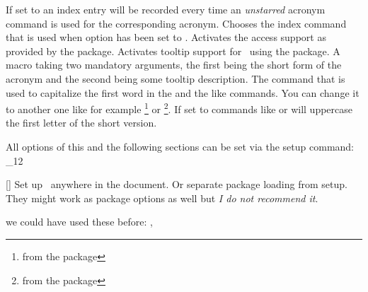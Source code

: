 \documentclass[load-preamble+]{cnltx-doc}
\makeatletter
\renewenvironment{commands}
  {%
    \cnltx@set@catcode_{12}%
    \let\command\cnltx@command
    \cnltxlist
  }
  {\endcnltxlist}
\makeatother
\begin{document}
\begin{options}
    If set to  an index entry will be recorded every time an
    \emph{unstarred} acronym command is used for the corresponding acronym.
    Chooses the index command that is used when option  has been
    set to .
    Activates the access support as provided by the  package.
    Activates tooltip support for \acro\ using the
     package.
    A macro taking two mandatory arguments, the first being
    the short form of the acronym and the second being some tooltip
    description.
    The command that is used to capitalize the first word in the  and
    the like commands.  You can change it to another one like for example
    \footnote{from the  package} or
    \footnote{from the  package}.
    If set to  commands like  or 
    will uppercase the first letter of the short version.
\end{options}
 
All options of this and the following sections can be set via the setup command:
\begin{commands}
  \command{acsetup}[]
   Set up \acro\ anywhere in the document.  Or separate package loading from
   setup.
\end{commands}
They might work as package options as well but \emph{I do not recommend it}. 

\begin{example}
  we could have used these before: \nato, \ny
\end{example}
\end{document}
